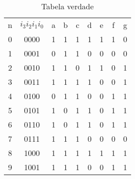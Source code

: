 \documentclass[a4paper]{article}
\begin{document}
\begin{table}[h]
\centering
\begin{tabular}{| *{9}{c |}}%
	\hline
	n\textordmasculine	&$i_3i_2i_1i_0$	&a &b &c &d &e &f &g \\
	0 &0000 &1 &1 &1 &1 &1 &1 &0 \\
	1 &0001 &0 &1 &1 &0 &0 &0 &0 \\
	2 &0010 &1 &1 &0 &1 &1 &0 &1 \\
	3 &0011 &1 &1 &1 &1 &0 &0 &1 \\
	4 &0100 &0 &1 &1 &0 &0 &1 &1 \\
	5 &0101 &1 &0 &1 &1 &0 &1 &1 \\
	6 &0110 &1 &0 &1 &1 &0 &1 &1 \\
	7 &0111 &1 &1 &1 &0 &0 &0 &0 \\
	8 &1000 &1 &1 &1 &1 &1 &1 &1 \\
	9 &1001 &1 &1 &1 &0 &0 &1 &1 \\ 
	\hline
\end{tabular}
\caption{Tabela verdade}
\end{table}




\FloatBarrier
\end{document}
